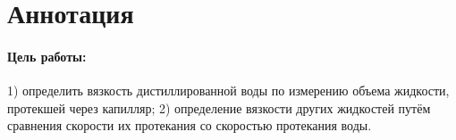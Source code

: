 \documentclass[a4paper,12pt]{report}
\begin{document}
	
	\newpage
    \pagestyle{fancy}

    \fancyhead{}
    \fancyfoot{}
    \fancyhead[L]{\rightmark}
    \fancyhead[R]{\thepage}

    \section*{Аннотация}
        \paragraph*{Цель работы:} 1) определить вязкость дистиллированной воды по измерению объема жидкости, протекшей через капилляр; 2) определение вязкости других жидкостей путём сравнения скорости их протекания со скоростью протекания воды.
\end{document}
